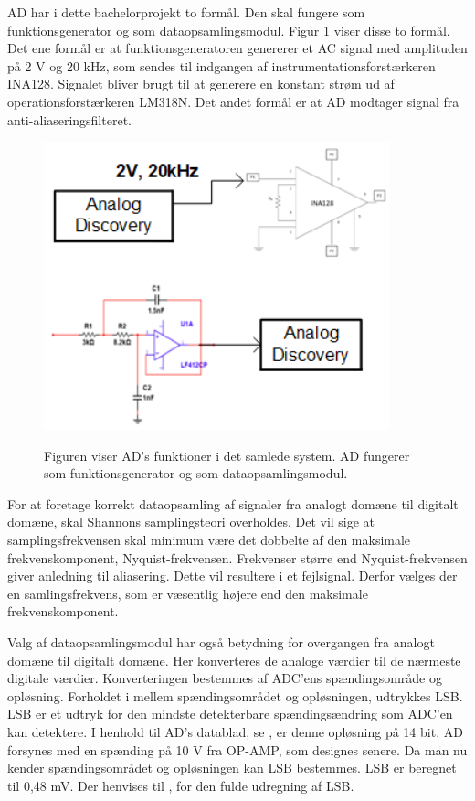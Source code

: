 AD har i dette bachelorprojekt to formål. Den skal fungere som funktionsgenerator og som dataopsamlingsmodul. Figur \ref{fig:ADogINA128} viser disse to formål. Det ene formål er at funktionsgeneratoren genererer et AC signal med amplituden på 2 V og 20 kHz, som sendes til indgangen af instrumentationsforstærkeren INA128. Signalet bliver brugt til at generere en konstant strøm ud af operationsforstærkeren LM318N. Det andet formål er at AD modtager signal fra anti-aliaseringsfilteret.

\begin{figure}[H]
\centering
{\includegraphics[width=10cm]
{Figure/ADogINA128}}
\caption{Figuren viser AD's funktioner i det samlede system. AD fungerer som funktionsgenerator og som dataopsamlingsmodul.}
\label{fig:ADogINA128}
\end{figure}

For at foretage korrekt dataopsamling af signaler fra analogt domæne til digitalt domæne, skal Shannons samplingsteori overholdes. Det vil sige at samplingsfrekvensen skal minimum være det dobbelte af den maksimale frekvenskomponent, Nyquist-frekvensen. Frekvenser større end Nyquist-frekvensen giver anledning til aliasering. Dette vil resultere i et fejlsignal. Derfor vælges der en samlingsfrekvens, som er væsentlig højere end den maksimale frekvenskomponent. 

Valg af dataopsamlingsmodul har også betydning for overgangen fra analogt domæne til digitalt domæne. Her konverteres de analoge værdier til de nærmeste digitale værdier. Konverteringen bestemmes af ADC'ens spændingsområde og opløsning. Forholdet i mellem spændingsområdet og opløsningen, udtrykkes LSB. LSB er et udtryk for den mindste detekterbare spændingsændring som ADC'en kan detektere. I henhold til AD's datablad, se , er denne opløsning på 14 bit. AD forsynes med en spænding på 10 V fra OP-AMP, som designes senere. Da man nu kender  spændingsområdet og opløsningen kan LSB bestemmes. LSB er beregnet til 0,48 mV. Der henvises til , for den fulde udregning af LSB.

